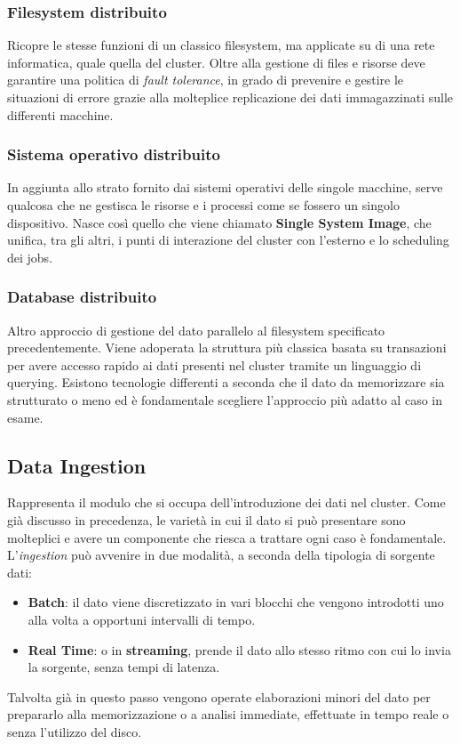 \subsubsection{Filesystem distribuito} 
Ricopre le stesse funzioni di un classico filesystem, ma applicate su di una rete informatica, quale quella del cluster. Oltre alla gestione di files e risorse deve garantire una politica di \textit{fault tolerance}, in grado di prevenire e gestire le situazioni di errore grazie alla molteplice replicazione dei dati immagazzinati sulle differenti macchine.	

\subsubsection{Sistema operativo distribuito} 
In aggiunta allo strato fornito dai sistemi operativi delle singole macchine, serve qualcosa che ne gestisca le risorse e i processi come se fossero un singolo dispositivo. Nasce così quello che viene chiamato \textbf{Single System Image}, che unifica, tra gli altri, i punti di interazione del cluster con l'esterno e lo scheduling dei jobs.	

\subsubsection{Database distribuito}
Altro approccio di gestione del dato parallelo al filesystem specificato precedentemente. Viene adoperata la struttura più classica basata su transazioni per avere accesso rapido ai dati presenti nel cluster tramite un linguaggio di querying. Esistono tecnologie differenti a seconda che il dato da memorizzare sia strutturato o meno ed è fondamentale scegliere l'approccio più adatto al caso in esame.

\subsection{Data Ingestion}
Rappresenta il modulo che si occupa dell'introduzione dei dati nel cluster. Come già discusso in precedenza, le varietà in cui il dato si può presentare sono molteplici e avere un componente che riesca a trattare ogni caso è fondamentale. L'\textit{ingestion} può avvenire in due modalità, a seconda della tipologia di sorgente dati:
\begin{itemize}
	\item \textbf{Batch}: il dato viene discretizzato in vari blocchi che vengono introdotti uno alla volta a opportuni intervalli di tempo.
	\item \textbf{Real Time}: o in \textbf{streaming}, prende il dato allo stesso ritmo con cui lo invia la sorgente, senza tempi di latenza.	
\end{itemize}
Talvolta già in questo passo vengono operate elaborazioni minori del dato per prepararlo alla memorizzazione o a analisi immediate, effettuate in tempo reale o senza l'utilizzo del disco.

